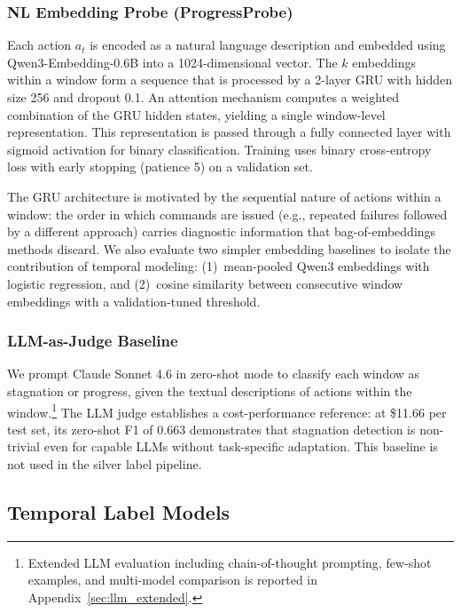 \subsubsection{NL Embedding Probe (ProgressProbe)}
\label{sec:progressprobe}

Each action $a_t$ is encoded as a natural language description and embedded using Qwen3-Embedding-0.6B \citep{zhang2025qwen3embedding} into a 1024-dimensional vector.
The $k$ embeddings within a window form a sequence that is processed by a 2-layer GRU \citep{cho2014gru} with hidden size 256 and dropout 0.1.
An attention mechanism \citep{bahdanau2015attention} computes a weighted combination of the GRU hidden states, yielding a single window-level representation.
This representation is passed through a fully connected layer with sigmoid activation for binary classification.
Training uses binary cross-entropy loss with early stopping (patience 5) on a validation set.

The GRU architecture is motivated by the sequential nature of actions within a window: the order in which commands are issued (e.g., repeated failures followed by a different approach) carries diagnostic information that bag-of-embeddings methods discard.
We also evaluate two simpler embedding baselines to isolate the contribution of temporal modeling: (1)~mean-pooled Qwen3 embeddings with logistic regression, and (2)~cosine similarity between consecutive window embeddings with a validation-tuned threshold.

\subsubsection{LLM-as-Judge Baseline}
\label{sec:llm_judge}

We prompt Claude Sonnet 4.6 in zero-shot mode to classify each window as stagnation or progress, given the textual descriptions of actions within the window.\footnote{Extended LLM evaluation including chain-of-thought prompting, few-shot examples, and multi-model comparison is reported in Appendix~\ref{sec:llm_extended}.}
The LLM judge establishes a cost-performance reference: at \$11.66 per test set, its zero-shot F1 of 0.663 demonstrates that stagnation detection is non-trivial even for capable LLMs without task-specific adaptation.
This baseline is not used in the silver label pipeline.

\subsection{Temporal Label Models}
\label{sec:temporal_models}

